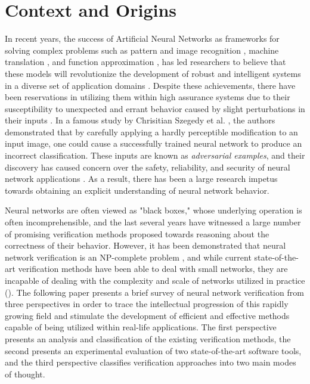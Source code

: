 \documentclass[10pt,conference]{IEEEtran}
\newcommand{\todo}[1]{\textcolor{red}{\textbf{\underline{TODO:}} #1}}
\begin{document}
\section{Context and Origins \label{sec: context}}
In recent years, the success of Artificial Neural Networks as frameworks for solving complex problems such as pattern and image recognition \cite{SchumannApplications2010}, machine translation \cite{RussellRobust2016}, and function approximation \cite{WeimingReachability2018}, has led researchers to believe that these models will revolutionize the development of robust and intelligent systems in a diverse set of application domains \cite{russell_dewey_tegmark_2015}. Despite these achievements, there have been reservations in utilizing them within high assurance systems due to their susceptibility to unexpected and errant behavior caused by slight perturbations in their inputs \cite{KurakinAdversarial2018}. In a famous study by Chrisitian Szegedy et al. \cite{SzegedyIntriguing2013}, the authors demonstrated that by carefully applying a hardly perceptible modification to an input image, one could cause a successfully trained neural network to produce an incorrect classification. These inputs are known as \emph{adversarial examples}, and their discovery has caused concern over the safety, reliability, and security of neural network applications \cite{XiangVerification2018}. As a result, there has been a large research impetus towards obtaining an explicit understanding of neural network behavior. 

 Neural networks are often viewed as "black boxes," whose underlying operation is often incomprehensible, and the last several years have witnessed a large number of promising verification methods proposed towards reasoning about the correctness of their behavior. However, it has been demonstrated that neural network verification is an NP-complete problem \cite{KatzReluplex2017}, and while current state-of-the-art verification methods have been able to deal with small networks, they are incapable of dealing with the complexity and scale of networks utilized in practice (\cite{LiuDeepArchitechtures2016, DvijothamDualScalable2018, AlurFormalVerificationHybridSystems}). 
 The following paper presents a brief survey of neural network verification from three perspectives in order to trace the intellectual progression of this rapidly growing field and stimulate the development of efficient and effective methods capable of being utilized within real-life applications. The first perspective presents an analysis and classification of the existing verification methods, the second presents an experimental evaluation of two state-of-the-art software tools, and the third perspective classifies verification approaches into two main modes of thought.
\end{document}
